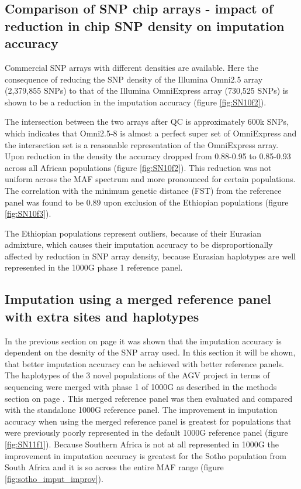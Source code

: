 \subsection{Comparison of SNP chip arrays - impact of reduction in chip SNP density on imputation accuracy}
\label{subsec:thinning}
Commercial \gls{SNP} arrays with different densities are available. Here the consequence of reducing the \gls{SNP} density of the Illumina Omni2.5 array (2,379,855 SNPs) to that of the Illumina OmniExpress array (730,525 SNPs) is shown to be a reduction in the imputation accuracy (figure \ref{fig:SN10f2}).

The intersection between the two arrays after \gls{QC} is approximately 600k \glspl{SNP}, which indicates that Omni2.5-8 is almost a perfect super set of OmniExpress and the intersection set is a reasonable representation of the OmniExpress array. Upon reduction in the density the accuracy dropped from 0.88-0.95 to 0.85-0.93 across all African populations (figure \ref{fig:SN10f2}). This reduction was not uniform across the \gls{MAF} spectrum and more pronounced for certain populations. The correlation with the minimum genetic distance (\gls{FST}) from the reference panel was found to be 0.89 upon exclusion of the Ethiopian populations (figure \ref{fig:SN10f3}).

The Ethiopian populations represent outliers, because of their Eurasian admixture, which causes their imputation accuracy to be disproportionally affected by reduction in \gls{SNP} array density, because Eurasian haplotypes are well represented in the \gls{1000G} phase 1 reference panel.\cite{1000G2012}


\subsection{Imputation using a merged reference panel with extra sites and haplotypes}

In the previous section on page \pageref{subsec:thinning} it was shown that the imputation accuracy is dependent on the desnity of the \gls{SNP} array used. In this section it will be shown, that better imputation accuracy can be achieved with better reference panels.
The haplotypes of the 3 novel populations of the \gls{AGV} project\cite{Gurdasani2015} in terms of sequencing were merged with phase 1 of \gls{1000G} as described in the methods section on page \pageref{subsec:panel_merger}. This merged reference panel was then evaluated and compared with the standalone \gls{1000G} reference panel. The improvement in imputation accuracy when using the merged reference panel is greatest for populations that were previously poorly represented in the default \gls{1000G} reference panel (figure \ref{fig:SN11f1}). Because Southern Africa is not at all represented in \gls{1000G} the improvement in imputation accuracy is greatest for the Sotho population from South Africa and it is so across the entire \gls{MAF} range (figure \ref{fig:sotho_imput_improv}).




